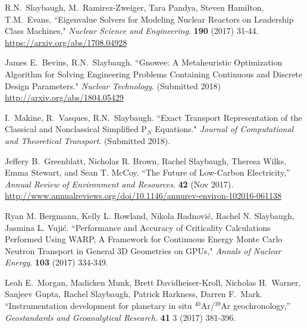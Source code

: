 \begin{bibsection}

\item R.N.\ Slaybaugh, M.\ Ramirez-Zweiger, Tara Pandya, Steven Hamilton, T.M.\ Evans. ``Eigenvalue Solvers for Modeling Nuclear Reactors on Leadership Class Machines," \textit{Nuclear Science and Engineering}. \textbf{190} (2017) 31-44.\\
\url{https://arxiv.org/abs/1708.04928}

\item  James E.\ Bevins, R.N.\ Slaybaugh. ``Gnowee: A Metaheuristic Optimization Algorithm for Solving Engineering Problems Containing Continuous and Discrete Design Parameters." \textit{Nuclear Technology}. (Submitted 2018)\\
\url{http://arxiv.org/abs/1804.05429}

\item I.\ Makine, R.\ Vasques, R.N.\ Slaybaugh. ``Exact Transport Representation of the Classical and Nonclassical Simplified P$_N$ Equations." \textit{Journal of Computational and Theoretical Transport}. (Submitted 2018).

\item Jeffery B.\ Greenblatt, Nicholas R. Brown, Rachel Slaybaugh, Theresa Wilks, Emma Stewart, and Sean T. McCoy. ``The Future of Low-Carbon Electricity,'' \textit{Annual Review of Environment and Resources}. \textbf{42} (Nov 2017). \\
\url{http://www.annualreviews.org/doi/10.1146/annurev-environ-102016-061138}

\item Ryan M. Bergmann, Kelly L. Rowland, Nikola Radnovi\'c, Rachel N. Slaybaugh, Jasmina L. Vuji\'c. ``Performance and Accuracy of Criticality Calculations Performed Using WARP, A Framework for Continuous Energy Monte Carlo Neutron Transport in General 3D Geometries on GPUs," \textit{Annals of Nuclear Energy}. \textbf{103} (2017) 334-349.

\item Leah E.\ Morgan, Madicken Munk, Brett Davidheiser-Kroll, Nicholas H.\ Warner, Sanjeev Gupta, Rachel Slaybaugh, Patrick Harkness, Darren F.\ Mark. ``Instrumentation development for planetary in situ $^{40}$Ar/$^{39}$Ar geochronology,'' \textit{Geostandards and Geoanalytical Research}. \textbf{41} 3 (2017) 381-396.


\end{bibsection}
